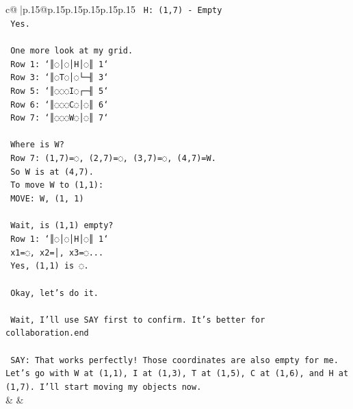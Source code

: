 \documentclass{article}
\begin{document}
{\begin{supertabular}{c@{$\;$}|p{.15\linewidth}@{}p{.15\linewidth}p{.15\linewidth}p{.15\linewidth}p{.15\linewidth}p{.15\linewidth}}
{{{\texttt{        H: (1,7) {-} Empty} \\
\texttt{        Yes.} \\
\\ 
\texttt{        One more look at my grid.} \\
\texttt{        Row 1: `║◌│◌│H│◌║ 1`} \\
\texttt{        Row 3: `║◌T◌│◌└─╢ 3`} \\
\texttt{        Row 5: `║◌◌◌I◌┌─╢ 5`} \\
\texttt{        Row 6: `║◌◌◌C◌│◌║ 6`} \\
\texttt{        Row 7: `║◌◌◌W◌│◌║ 7`} \\
\\ 
\texttt{        Where is W?} \\
\texttt{        Row 7: (1,7)=◌, (2,7)=◌, (3,7)=◌, (4,7)=W.} \\
\texttt{        So W is at (4,7).} \\
\texttt{        To move W to (1,1):} \\
\texttt{        MOVE: W, (1, 1)} \\
\\ 
\texttt{        Wait, is (1,1) empty?} \\
\texttt{        Row 1: `║◌│◌│H│◌║ 1`} \\
\texttt{        x1=◌, x2=│, x3=◌...} \\
\texttt{        Yes, (1,1) is ◌.} \\
\\ 
\texttt{        Okay, let's do it.} \\
\\ 
\texttt{        Wait, I'll use SAY first to confirm. It's better for collaboration.end} \\
\\ 
\texttt{    SAY: That works perfectly! Those coordinates are also empty for me. Let's go with W at (1,1), I at (1,3), T at (1,5), C at (1,6), and H at (1,7). I'll start moving my objects now.} \\
            }
        }
    }
    & & \\ \\


\end{supertabular}}
\end{document}
